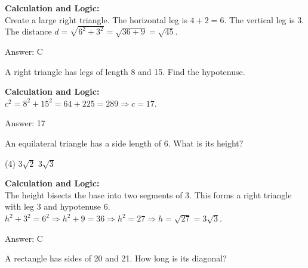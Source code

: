 \documentclass[11pt,paper=a4,answers]{exam}
\begin{document}
\begin{questions}
\begin{solution}
\textbf{Calculation and Logic:} \\
Create a large right triangle. The horizontal leg is $4 + 2 = 6$. The vertical leg is 3. The distance $d = \sqrt{6^2 + 3^2} = \sqrt{36 + 9} = \sqrt{45}$.

\vspace{30pt}

Answer: \colorbox{yellow!100}{C}
\end{solution}

\vspace{60pt}

\question
A right triangle has legs of length 8 and 15. Find the hypotenuse.

\begin{solution}
\textbf{Calculation and Logic:} \\
$c^2 = 8^2 + 15^2 = 64 + 225 = 289 \Rightarrow c = 17$.

\vspace{30pt}

Answer: \colorbox{yellow!100}{17}
\end{solution}

\vspace{60pt}

\question
An equilateral triangle has a side length of 6. What is its height?
\begin{tasks}(4)
    \task $3\sqrt{2}$
    \task $3\sqrt{3}$
\end{tasks}

\begin{solution}
\textbf{Calculation and Logic:} \\
The height bisects the base into two segments of 3. This forms a right triangle with leg 3 and hypotenuse 6. $h^2 + 3^2 = 6^2 \Rightarrow h^2 + 9 = 36 \Rightarrow h^2 = 27 \Rightarrow h = \sqrt{27} = 3\sqrt{3}$.

\vspace{30pt}

Answer: \colorbox{yellow!100}{C}
\end{solution}

\vspace{60pt}

\question
A rectangle has sides of 20 and 21. How long is its diagonal?


\end{questions}
\end{document}
